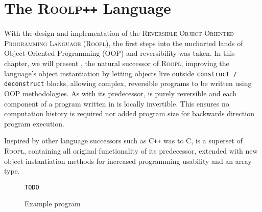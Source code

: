 \chapter{The \textsc{Roolp\texttt{++}} Language}
\label{chp:rooplpp}
With the design and implementation of the \textsc{Reversible Object-Oriented Programming Language} (\textsc{Roopl}), the first steps into the uncharted lands of Object-Oriented Programming (OOP) and reversibility was taken. In this chapter, we will present \rooplpp, the natural successor of \textsc{Roopl}, improving the language's object instantiation by letting objects live outside \texttt{construct / deconstruct} blocks, allowing complex, reversible programs to be written using OOP methodologies. As with its predecessor, \rooplpp is purely reversible and each component of a program written in \rooplpp is locally invertible. This ensures no computation history is required nor added program size for backwards direction program execution.

Inspired by other language successors such as \textsc{C\texttt{++}} was to \textsc{C}, \rooplpp is a superset of \textsc{Roopl}, containing all original functionality of its predecessor, extended with new object instantiation methods for increased programming usability and an array type.

\begin{figure}
    \texttt{TODO}
    \caption{Example \rooplpp program}    
\end{figure}
\newpage


